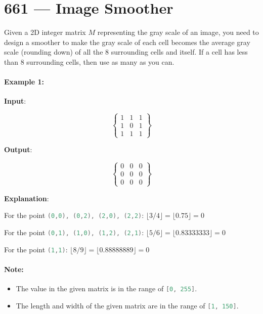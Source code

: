 \section{661 --- Image Smoother}
Given a 2D integer matrix $M$ representing the gray scale of an image, you need to design a smoother to make the gray scale of each cell becomes the average gray scale (rounding down) of all the 8 surrounding cells and itself. If a cell has less than 8 surrounding cells, then use as many as you can.

\paragraph{Example 1:}
\begin{flushleft}

\textbf{Input}:

\[
\begin{Bmatrix}
1 & 1 & 1\\
1 & 0 & 1\\
1 & 1 & 1
\end{Bmatrix}
\]

\textbf{Output}:

\[
\begin{Bmatrix}
0 & 0 & 0\\
0 & 0 & 0\\
0 & 0 & 0
\end{Bmatrix}
\]

\textbf{Explanation}:

For the point \lstinline[language=Java, basicstyle=\small\ttfamily, keywordstyle=\bfseries\color{green!40!black}]|(0,0), (0,2), (2,0), (2,2)|: $\lfloor3/4\rfloor = \lfloor0.75\rfloor = 0$

For the point \lstinline[language=Java, basicstyle=\small\ttfamily, keywordstyle=\bfseries\color{green!40!black}]|(0,1), (1,0), (1,2), (2,1)|: $\lfloor5/6\rfloor = \lfloor0.83333333\rfloor = 0$

For the point \lstinline[language=Java, basicstyle=\small\ttfamily, keywordstyle=\bfseries\color{green!40!black}]|(1,1)|: $\lfloor 8/9 \rfloor = \lfloor 0.88888889\rfloor = 0$

\end{flushleft}

\paragraph{Note:}
\begin{itemize}
\item The value in the given matrix is in the range of \lstinline[language=Java, basicstyle=\small\ttfamily, keywordstyle=\bfseries\color{green!40!black}]|[0, 255]|.
\item The length and width of the given matrix are in the range of \lstinline[language=Java, basicstyle=\small\ttfamily, keywordstyle=\bfseries\color{green!40!black}]|[1, 150]|.
\end{itemize}

